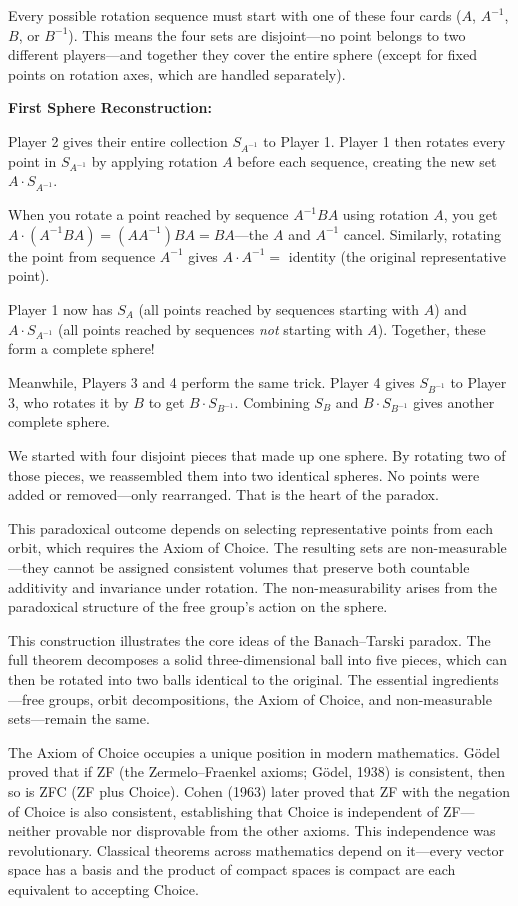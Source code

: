 Every possible rotation sequence must start with one of these four cards ($A$, $A^{-1}$, $B$, or $B^{-1}$). This means the four sets are disjoint—no point belongs to two different players—and together they cover the entire sphere (except for fixed points on rotation axes, which are handled separately).

\textbf{First Sphere Reconstruction:}

Player 2 gives their entire collection $S_{A^{-1}}$ to Player 1. Player 1 then rotates every point in $S_{A^{-1}}$ by applying rotation $A$ before each sequence, creating the new set $A \cdot S_{A^{-1}}$.

When you rotate a point reached by sequence $A^{-1}BA$ using rotation $A$, you get $A \cdot (A^{-1}BA) = (AA^{-1})BA = BA$—the $A$ and $A^{-1}$ cancel. Similarly, rotating the point from sequence $A^{-1}$ gives $A \cdot A^{-1} = $ identity (the original representative point).

Player 1 now has $S_A$ (all points reached by sequences starting with $A$) and $A \cdot S_{A^{-1}}$ (all points reached by sequences \textit{not} starting with $A$). Together, these form a complete sphere!

Meanwhile, Players 3 and 4 perform the same trick. Player 4 gives $S_{B^{-1}}$ to Player 3, who rotates it by $B$ to get $B \cdot S_{B^{-1}}$. Combining $S_B$ and $B \cdot S_{B^{-1}}$ gives another complete sphere.

We started with four disjoint pieces that made up one sphere. By rotating two of those pieces, we reassembled them into two identical spheres. No points were added or removed—only rearranged. That is the heart of the paradox.

This paradoxical outcome depends on selecting representative points from each orbit, which requires the Axiom of Choice. The resulting sets are non-measurable—they cannot be assigned consistent volumes that preserve both countable additivity and invariance under rotation. The non-measurability arises from the paradoxical structure of the free group's action on the sphere.

This construction illustrates the core ideas of the Banach–Tarski paradox. The full theorem decomposes a solid three-dimensional ball into five pieces, which can then be rotated into two balls identical to the original. The essential ingredients—free groups, orbit decompositions, the Axiom of Choice, and non-measurable sets—remain the same.

The Axiom of Choice occupies a unique position in modern mathematics. Gödel proved that if ZF (the Zermelo–Fraenkel axioms; Gödel, 1938) is consistent, then so is ZFC (ZF plus Choice). Cohen (1963) later proved that ZF with the negation of Choice is also consistent, establishing that Choice is independent of ZF—neither provable nor disprovable from the other axioms. This independence was revolutionary. Classical theorems across mathematics depend on it—\QENOpen{}every vector space has a basis\QENClose{} and \QENOpen{}the product of compact spaces is compact\QENClose{} are each equivalent to accepting Choice.

